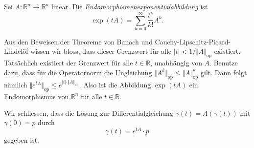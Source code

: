\documentclass[../main.tex]{subfiles}
\begin{document}
\begin{definition}
  Sei $A \colon \mathbb{R}^n \to \mathbb{R}^n$ linear.
  Die \emph{Endomorphismenexponentialabbildung} ist
  \[
    \exp(tA) = \sum_{k=0}^{\infty} \frac{t^k}{k!} A^k.
  \]
\end{definition}

\begin{remark}
  Aus den Beweisen der Theoreme von Banach
  und Cauchy-Lipschitz-Picard-Lindelöf wissen wir bloss,
  dass dieser Grenzwert für alle $|t| < 1/\Vert A \Vert_{\text{op}}$ 
  existiert. Tatsächlich existiert der Grenzwert für alle
  $t \in \mathbb{R}$, unabhängig von $A$.
  Benutze dazu, dass für die Operatornorm die Ungleichung
  $\Vert A^k \Vert_{\text{op}} \leq \Vert A \Vert_{\text{op}}^k$ 
  gilt. Dann folgt nämlich
  $\Vert e^{tA} \Vert_{\text{op}} \leq e^{|t| \cdot \Vert A \Vert_{\text{op}}}$.
  Also ist die Abbildung $\exp(tA)$ ein Endomorphismus von $\mathbb{R}^n$ 
  für alle $t \in \mathbb{R}$.
\end{remark}

Wir schliessen, dass die Lösung zur Differentialgleichung
$\dot \gamma(t) = A(\gamma(t))$ mit $\gamma(0) = p$ 
durch
\[
  \gamma(t) = e^{tA} \cdot p
\]
gegeben ist.
\end{document}
